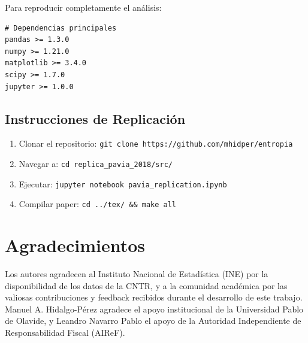 \documentclass{article}
\begin{document}
Para reproducir completamente el análisis:

\begin{verbatim}
# Dependencias principales
pandas >= 1.3.0
numpy >= 1.21.0
matplotlib >= 3.4.0
scipy >= 1.7.0
jupyter >= 1.0.0
\end{verbatim}

\subsection{Instrucciones de Replicación}

\begin{enumerate}
\item Clonar el repositorio: \texttt{git clone https://github.com/mhidper/entropia}
\item Navegar a: \texttt{cd replica\_pavia\_2018/src/}
\item Ejecutar: \texttt{jupyter notebook pavia\_replication.ipynb}
\item Compilar paper: \texttt{cd ../tex/ \&\& make all}
\end{enumerate}

\section*{Agradecimientos}

Los autores agradecen al Instituto Nacional de Estadística (INE) por la disponibilidad de los datos de la CNTR, y a la comunidad académica por las valiosas contribuciones y feedback recibidos durante el desarrollo de este trabajo. Manuel A. Hidalgo-Pérez agradece el apoyo institucional de la Universidad Pablo de Olavide, y Leandro Navarro Pablo el apoyo de la Autoridad Independiente de Responsabilidad Fiscal (AIReF).



\end{document}
